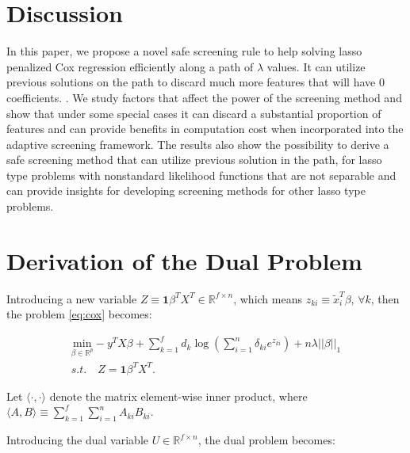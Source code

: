 \section{Discussion}

In this paper, we propose a novel safe screening rule to help solving lasso penalized Cox regression efficiently along a path of $\lambda$ values. It can utilize previous solutions on the path to discard much more features that will have 0 coefficients. . We study factors that affect the power of the screening method and show that under some special cases it can discard a substantial proportion of features and can provide benefits in computation cost when incorporated into the adaptive screening framework. The results also show the possibility to derive a safe screening method that can utilize previous solution in the path, for lasso type problems with nonstandard likelihood functions that are not separable and can provide insights for developing screening methods for other lasso type problems.

\appendix
\appendixpage


\section{Derivation of the Dual Problem}
\label{sec:dual}

Introducing a new variable $Z\equiv\mathbf{1}\beta^TX^T\in\mathbb{R}^{f\times n}$, which means $z_{ki}\equiv\tilde{x}_i^T\beta,\,\forall k$, then the problem \eqref{eq:cox} becomes:

\begin{equation}
    \label{eq:dual+z}
    \begin{gathered}
    \underset{\beta\in \mathbb{R}^p}{\mathrm{min}}-y^TX\beta+\sum_{k=1}^f d_k\log\left(\sum_{i=1}^n \delta_{ki} e^{z_{ki}}\right)+n\lambda||\beta||_1\\s.t.\quad Z=\mathbf{1}\beta^TX^T.
\end{gathered}
\end{equation}

Let $\langle\cdot,\cdot\rangle$ denote the matrix element-wise inner product, where $\langle A,B \rangle\equiv\sum_{k=1}^f\sum_{i=1}^nA_{ki}B_{ki}$.

Introducing the dual variable $U\in\mathbb{R}^{f\times n}$, the dual problem becomes:

